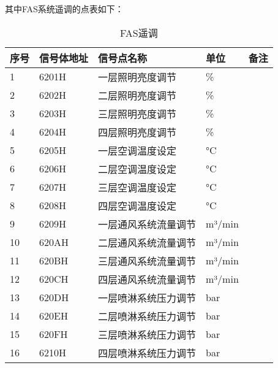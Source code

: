 其中FAS系统遥调的点表如下：
\begin{longtable}[c]{|l|l|l|l|l|}
	\caption{FAS遥调}
	\label{tab:my-table}\\
	\hline
	\textbf{序号} & \textbf{信号体地址} & \textbf{信号点名称} & \textbf{单位} & \textbf{备注} \\ \hline
	\endfirsthead
	\endhead
	1           & 6201H          & 一层照明亮度调节       & \%          &             \\ \hline
	2           & 6202H          & 二层照明亮度调节       & \%          &             \\ \hline
	3           & 6203H          & 三层照明亮度调节       & \%          &             \\ \hline
	4           & 6204H          & 四层照明亮度调节       & \%          &             \\ \hline
	5           & 6205H          & 一层空调温度设定       & °C          &             \\ \hline
	6           & 6206H          & 二层空调温度设定       & °C          &             \\ \hline
	7           & 6207H          & 三层空调温度设定       & °C          &             \\ \hline
	8           & 6208H          & 四层空调温度设定       & °C          &             \\ \hline
	9           & 6209H          & 一层通风系统流量调节     & m³/min      &             \\ \hline
	10          & 620AH          & 二层通风系统流量调节     & m³/min      &             \\ \hline
	11          & 620BH          & 三层通风系统流量调节     & m³/min      &             \\ \hline
	12          & 620CH          & 四层通风系统流量调节     & m³/min      &             \\ \hline
	13          & 620DH          & 一层喷淋系统压力调节     & bar         &             \\ \hline
	14          & 620EH          & 二层喷淋系统压力调节     & bar         &             \\ \hline
	15          & 620FH          & 三层喷淋系统压力调节     & bar         &             \\ \hline
	16          & 6210H          & 四层喷淋系统压力调节     & bar         &             \\ \hline

\end{longtable}
